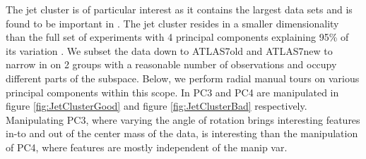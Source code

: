 \documentclass{monashthesis}
\begin{document}
The jet cluster is of particular interest as it contains the largest
data sets and is found to be important in
\textcite{wang_visualizing_2018}. The jet cluster resides in a smaller
dimensionality than the full set of experiments with 4 principal
components explaining 95\% of its variation
\autocite{cook_dynamical_2018}. We subset the data down to ATLAS7old and
ATLAS7new to narrow in on 2 groups with a reasonable number of
observations and occupy different parts of the subspace. Below, we
perform radial manual tours on various principal components within this
scope. In PC3 and PC4 are manipulated in figure \ref{fig:JetClusterGood}
and figure \ref{fig:JetClusterBad} respectively. Manipulating PC3, where
varying the angle of rotation brings interesting features in-to and out
of the center mass of the data, is interesting than the manipulation of
PC4, where features are mostly independent of the manip var.
\end{document}
